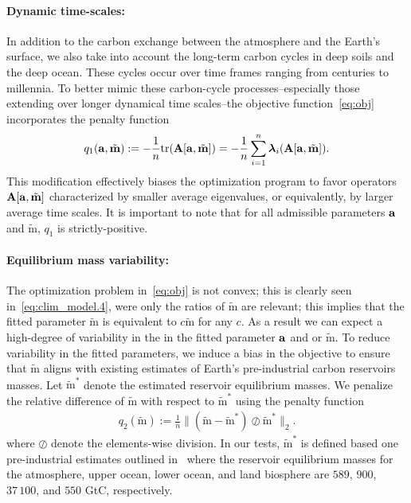 \documentclass[11pt, a4paper, pdftex, twoside, dvipsnames]{article}
\newcommand{\bb}[1]{\boldsymbol{\bold{#1}}}
\newcommand{\bbt}[1]{\tilde{\boldsymbol{\mathrm{#1}}}}
\newcommand{\tr}[1]{\text{tr}(#1)}
\newcommand{\ameq}[0]{\bb{a},\bbt{m}}
\begin{document}
\paragraph{Dynamic time-scales:}
In addition to the carbon exchange between the atmosphere and the Earth's surface, we also take into account the long-term carbon cycles in deep soils and the deep ocean. 
%
These cycles occur over time frames ranging from centuries to millennia. 
%
To better mimic these carbon-cycle processes--especially those extending over longer dynamical time scales--the objective function~\eqref{eq:obj} incorporates the penalty function 
%
\begin{align}\label{eq:q1}
	q_1(\ameq) := -\frac{1}{n} \tr{\bb{A}[\ameq]} = -\frac{1}{n}\sum_{i=1}^n \bb{\lambda}_i(\bb{A}[\ameq]).
\end{align}
This modification effectively biases the optimization program to favor operators $\bb{A}[\bb{a}, \bbt{m}]$ characterized by smaller average eigenvalues, or equivalently, by larger average time scales.
%
It is important to note that for all admissible parameters $\bb{a}$ and $\bbt{m}$, $q_1$ is strictly-positive. 


\paragraph{Equilibrium mass variability:}
The optimization problem in~\eqref{eq:obj} is not convex; this is clearly seen in~\eqref{eq:clim_model.4}, were only the ratios of $\bbt{m}$ are relevant; this implies that the fitted parameter $\bbt{m}$ is equivalent to $c\bbt{m}$ for any $c$.
%
As a result we can expect a high-degree of variability in the in the fitted parameter $\bb{a}$ and or $\bbt{m}$.
%
To reduce variability in the fitted parameters, we induce a bias in the objective to ensure that $\bbt{m}$ aligns with existing estimates of Earth's pre-industrial carbon reservoirs masses.
%
Let $\bbt{m}^*$ denote the estimated reservoir equilibrium masses.
%
We penalize the relative difference of $\bbt{m}$ with respect to $\bbt{m}^*$  using the penalty function  
%
\begin{align}\label{eq:q2}
	q_2(\bbt{m}) := \frac{1}{n} \Big\| (\bbt{m} - \bbt{m}^*) \oslash \bbt{m}^* \Big\|_2.
\end{align}
%
where $\oslash$ denote the elements-wise division. 
%
In our tests, $\bbt{m}^*$ is defined based one pre-industrial estimates outlined in~\cite{IPCC_carbon_cycle} where the reservoir equilibrium masses for the atmosphere, upper ocean, lower ocean, and land biosphere are $589$, $900$, $37\,100$, and $550$ GtC, respectively.
\end{document}
